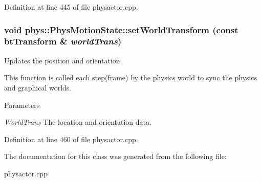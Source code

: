 Definition at line 445 of file physactor.cpp.

\hypertarget{classphys_1_1PhysMotionState_a91e372f8f474bb570e502ee42ec2deeb}{
\subsubsection[{setWorldTransform}]{\setlength{\rightskip}{0pt plus 5cm}void phys::PhysMotionState::setWorldTransform (const btTransform \& {\em worldTrans})}}
\label{dc/d0d/classphys_1_1PhysMotionState_a91e372f8f474bb570e502ee42ec2deeb}


Updates the position and orientation. 

This function is called each step(frame) by the physics world to sync the physics and graphical worlds. 
\begin{DoxyParams}{Parameters}
\item[{\em WorldTrans}]The location and orientation data. \end{DoxyParams}


Definition at line 460 of file physactor.cpp.



The documentation for this class was generated from the following file:\begin{DoxyCompactItemize}
\item 
physactor.cpp\end{DoxyCompactItemize}
